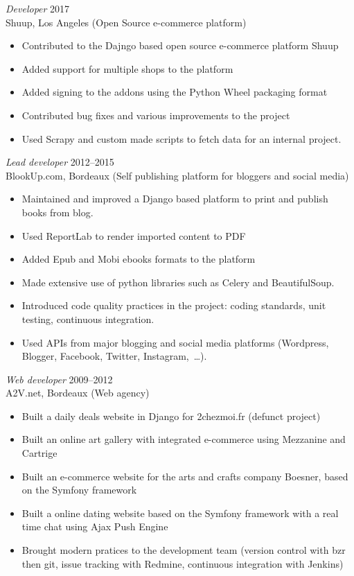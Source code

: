 \documentclass[line,resmargin]{res}
\begin{document}
\begin{resume}
{\sl Developer\/} \hfill 2017\\
Shuup, Los Angeles (Open Source e-commerce platform)
\begin{itemize} \itemsep -2pt
    \item Contributed to the Dajngo based open source e-commerce platform Shuup
    \item Added support for multiple shops to the platform
    \item Added signing to the addons using the Python Wheel packaging format
    \item Contributed bug fixes and various improvements to the project
    \item Used Scrapy and custom made scripts to fetch data for an internal project.
\end{itemize}

{\sl Lead developer\/} \hfill 2012--2015\\
BlookUp.com, Bordeaux (Self publishing platform for bloggers and social media)
\begin{itemize} \itemsep -2pt
    \item Maintained and improved a Django based platform to print and publish books from blog.
    \item Used ReportLab to render imported content to PDF
    \item Added Epub and Mobi ebooks formats to the platform
    \item Made extensive use of python libraries such as Celery and BeautifulSoup.
    \item Introduced code quality practices in the project: coding standards, unit testing, continuous integration.
    \item Used APIs from major blogging and social media platforms (Wordpress, Blogger, Facebook, Twitter, Instagram, …).
\end{itemize}

{\sl Web developer\/} \hfill 2009--2012 \\
A2V.net, Bordeaux (Web agency)
\begin{itemize}  \itemsep -2pt
    \item Built a daily deals website in Django for 2chezmoi.fr (defunct project)
    \item Built an online art gallery with integrated e-commerce using Mezzanine and Cartrige
    \item Built an e-commerce website for the arts and crafts company Boesner, based on the Symfony framework
    \item Built a online dating website based on the Symfony framework with a real time chat using Ajax Push Engine
    \item Brought modern pratices to the development team (version control with bzr then git,
        issue tracking with Redmine, continuous integration with Jenkins)
\end{itemize}


\end{resume}
\end{document}
